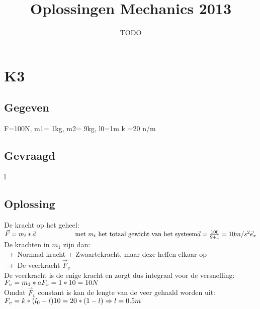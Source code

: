 \documentclass[10pt,a4paper]{article}
\title{Oplossingen Mechanics 2013}
\author{TODO}
\begin{document}
\maketitle
\pagebreak
\tableofcontents
\pagebreak

\section*{K3}
\subsection*{Gegeven}
F=100N, m1= 1kg, m2= 9kg, l0=1m k =20 n/m
\subsection*{Gevraagd}
l
\subsection{Oplossing}
De kracht op het geheel:\\
$\vec{F} = m_t * \vec{a}\text{\hspace{2cm} met $m_t$ het totaal gewicht van het systeem}\\
\vec{a} = \frac{100}{9+1} = 10 m/s^2 \vec{e}_x$\\

\noindent De krachten in $m_1$ zijn dan:\\
$\rightarrow$ Normaal kracht + Zwaartekracht, maar deze heffen elkaar op\\
$\rightarrow$ De veerkracht $\vec{F}_v$\\

\noindent De veerkracht is de enige kracht en zorgt dus integraal voor de versnelling:\\
$F_v = m_1*a\\
F_v = 1*10 = 10 N$\\

\noindent Omdat $\vec{F}_v$ constant is kan de lengte van de veer gehaald worden uit:\\
$F_v = k * (l_0 - l)\\
10 = 20 *(1 -l)\\
\Rightarrow l =0.5m$
\end{document}
